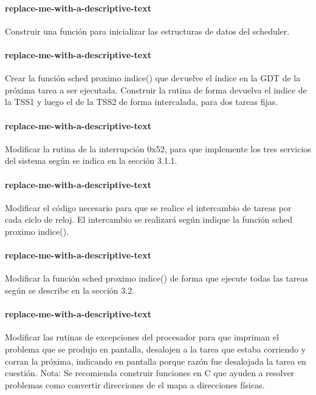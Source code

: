 \paragraph{replace-me-with-a-descriptive-text}\label{subsubsec:ej7-a}
Construir una función para inicializar las estructuras de datos del scheduler.
\hruler
{}

\paragraph{replace-me-with-a-descriptive-text}\label{subsubsec:ej7-b}
Crear la función sched proximo indice() que devuelve el índice en la GDT de la
próxima tarea a ser ejecutada. Construir la rutina de forma devuelva el indice
de la TSS1 y luego el de la TSS2 de forma intercalada, para dos tareas fijas.
\hruler
{}

\paragraph{replace-me-with-a-descriptive-text}\label{subsubsec:ej7-c}
Modificar la rutina de la interrupción 0x52, para que implemente los tres
servicios del sistema según se indica en la sección 3.1.1.
\hruler
{}

\paragraph{replace-me-with-a-descriptive-text}\label{subsubsec:ej7-d}
Modificar el código necesario para que se realice el intercambio de tareas por
cada ciclo de reloj. El intercambio se realizará según indique la función sched
proximo indice().
\hruler
{}

\paragraph{replace-me-with-a-descriptive-text}\label{subsubsec:ej7-e}
Modificar la función sched proximo indice() de forma que ejecute todas las
tareas según se describe en la sección 3.2.
\hruler
{}

\paragraph{replace-me-with-a-descriptive-text}\label{subsubsec:ej7-f}
Modificar las rutinas de excepciones del procesador para que impriman el
problema que se produjo en pantalla, desalojen a la tarea que estaba corriendo y
corran la próxima, indicando en pantalla porque razón fue desalojada la tarea en
cuestión. Nota: Se recomienda construir funciones en C que ayuden a resolver
problemas como convertir direcciones de el mapa a direcciones físicas.
\hruler
{}
